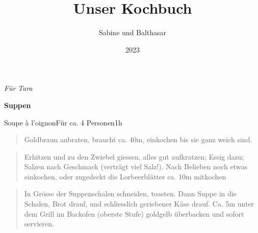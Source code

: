 \documentclass[
  a4paper,
]{article}
\title{Unser Kochbuch}
\author{Sabine und Balthasar}
\date{2023}
\begin{document}
\maketitle
\thispagestyle{empty}



\newpage
\vspace*{\fill}

\hfill\textit{Für Tara} \vspace*{\fill} \thispagestyle{empty} \newpage

\newpage
\vspace*{\fill}

\textbf{\Huge \sf Suppen} \vspace*{\fill} \thispagestyle{empty} \newpage

\begin{recipe}{Soupe à l’oignon}{Für ca. 4 Personen}{1h}


\begin{quote}
Goldbraun anbraten, braucht ca. 40m, einkochen bis sie ganz weich sind.
\end{quote}

\freeform\hrulefill


\begin{quote}
Erhitzen und zu den Zwiebel giessen, alles gut aufkratzen; Essig dazu;
Salzen nach Geschmack (verträgt viel Salz!). Nach Belieben noch etwas
einkochen, oder zugedeckt die Lorbeerblätter ca. 10m mitkochen
\end{quote}

\freeform\hrulefill


\begin{quote}
In Grösse der Suppenschalen schneiden, toasten. Dann Suppe in die
Schalen, Brot drauf, und schliesslich geriebener Käse drauf. Ca. 5m
unter dem Grill im Backofen (oberste Stufe) goldgelb überbacken und
sofort servieren.
\end{quote}

\freeform\hrulefill\newline{}\end{recipe}
\end{document}
